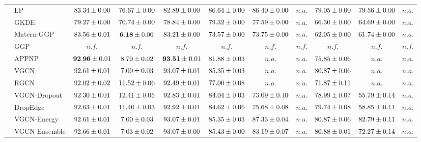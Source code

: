 \begin{table*}[!h]
{\begin{tabular}{ll|cc|cccc|ccc}
         & LP & ${83.34\tiny \pm 0.00}$ & ${76.67\tiny \pm 0.00}$ & ${82.89\tiny \pm 0.00}$ & ${{86.64}\tiny \pm 0.00}$ & ${86.40\tiny \pm 0.00}$ & $n.a.$ & ${79.05\tiny \pm 0.00}$ & ${79.56\tiny \pm 0.00}$ & $n.a.$\\
        & GKDE & ${79.27\tiny \pm 0.00}$ & ${70.74\tiny \pm 0.00}$ & ${78.84\tiny \pm 0.00}$ & ${79.32\tiny \pm 0.00}$ & ${77.59\tiny \pm 0.00}$ & $n.a.$ & ${66.30\tiny \pm 0.00}$ & ${64.69\tiny \pm 0.00}$ & $n.a.$\\
        & Matern-GGP & ${83.56\tiny \pm 0.01}$ & ${\mathbf{6.18}\tiny \pm 0.00}$ & ${83.21\tiny \pm 0.00}$ & ${73.57\tiny \pm 0.00}$ & ${73.75\tiny \pm 0.00}$ & $n.a.$ & ${62.05\tiny \pm 0.00}$ & ${61.74\tiny \pm 0.00}$ & $n.a.$\\
        & GGP & $n.f.$ & $n.f.$ & $n.f.$ & $n.f.$ & $n.f.$ & $n.f.$ & $n.f.$ & $n.f.$ & $n.f.$\\
        & APPNP & ${\mathbf{92.96}\tiny \pm 0.01}$ & ${8.70\tiny \pm 0.02}$ & ${\mathbf{93.51}\tiny \pm 0.01}$ & ${81.88\tiny \pm 0.03}$ & $n.a.$ & $n.a.$ & ${75.85\tiny \pm 0.06}$ & $n.a.$ & $n.a.$\\
        & VGCN & ${92.61\tiny \pm 0.01}$ & ${7.00\tiny \pm 0.03}$ & ${93.07\tiny \pm 0.01}$ & ${85.35\tiny \pm 0.03}$ & $n.a.$ & $n.a.$ & ${80.87\tiny \pm 0.06}$ & $n.a.$ & $n.a.$\\
        & RGCN & ${92.02\tiny \pm 0.02}$ & ${11.52\tiny \pm 0.06}$ & ${92.49\tiny \pm 0.01}$ & ${77.00\tiny \pm 0.08}$ & $n.a.$ & $n.a.$ & ${71.87\tiny \pm 0.11}$ & $n.a.$ & $n.a.$\\
        & VGCN-Dropout & ${92.30\tiny \pm 0.01}$ & ${12.41\tiny \pm 0.05}$ & ${92.83\tiny \pm 0.01}$ & ${84.04\tiny \pm 0.03}$ & ${73.09\tiny \pm 0.10}$ & $n.a.$ & ${78.99\tiny \pm 0.07}$ & ${55.79\tiny \pm 0.14}$ & $n.a.$\\
        & DropEdge & ${92.63\tiny \pm 0.01}$ & ${11.40\tiny \pm 0.03}$ & ${92.92\tiny \pm 0.01}$ & ${84.62\tiny \pm 0.06}$ & ${75.68\tiny \pm 0.08}$ & $n.a.$ & ${79.74\tiny \pm 0.08}$ & ${58.85\tiny \pm 0.11}$ & $n.a.$\\
        & VGCN-Energy & ${92.61\tiny \pm 0.01}$ & ${7.00\tiny \pm 0.03}$ & ${93.07\tiny \pm 0.01}$ & ${85.35\tiny \pm 0.03}$ & ${87.33\tiny \pm 0.04}$ & $n.a.$ & ${80.87\tiny \pm 0.06}$ & ${82.79\tiny \pm 0.11}$ & $n.a.$\\
        & VGCN-Ensemble & ${92.66\tiny \pm 0.01}$ & ${7.03\tiny \pm 0.02}$ & ${93.07\tiny \pm 0.00}$ & ${85.43\tiny \pm 0.00}$ & ${83.19\tiny \pm 0.07}$ & $n.a.$ & ${{80.88}\tiny \pm 0.01}$ & ${72.27\tiny \pm 0.14}$ & $n.a.$\\

\end{tabular}}
\end{table*}
